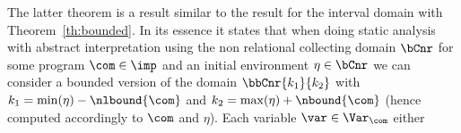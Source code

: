 The latter theorem is a result similar to the result for the interval
domain with Theorem~\ref{th:bounded}. In its essence it states that
when doing static analysis with abstract interpretation using the non
relational collecting domain \(\bCnr\) for some program
\(\com\in\imp\) and an initial environment \(\eta \in \bCnr\) we can
consider a bounded version of the domain \(\bbCnr{k_1}{k_2}\) with
\(k_1 = \min(\eta) - \nlbound{\com}\) and
\(k_2 = \max(\eta) + \nbound{\com}\) (hence computed accordingly to
\(\com\) and \(\eta\)). Each variable \(\var \in \Var_{\com}\) either
